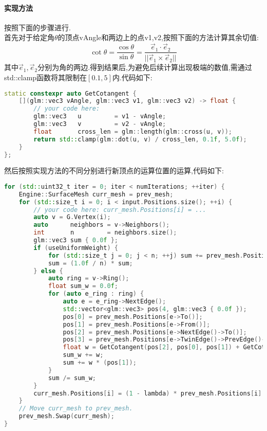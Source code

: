 \documentclass{ctexart}
\begin{document}
\paragraph{实现方法}
按照下面的步骤进行.\\
\indent 首先对于给定角$\theta$的顶点{\codefont vAngle}和两边上的点{\codefont v1,v2},按照下面的方法计算其余切值:
\[\cot\theta=\dfrac{\cos\theta}{\sin\theta}=\dfrac{\vec{e}_1\cdot\vec{e}_2}{||\vec{e}_1\times\vec{e}_2||}\]
其中$\vec{e}_1,\vec{e}_2$分别为角的两边.得到结果后,为避免后续计算出现极端的数值,需通过{\codefont std::clamp}函数将其限制在$[0.1,5]$内.代码如下:
\begin{lstlisting}[language=C++]
static constexpr auto GetCotangent {
    [](glm::vec3 vAngle, glm::vec3 v1, glm::vec3 v2) -> float {
        // your code here:
        glm::vec3   u         = v1 - vAngle;
        glm::vec3   v         = v2 - vAngle;
        float       cross_len = glm::length(glm::cross(u, v));
        return std::clamp(glm::dot(u, v) / cross_len, 0.1f, 5.0f);
    }
};
\end{lstlisting}
然后按照实现方法的不同分别进行新顶点的运算位置的运算,代码如下:
\begin{lstlisting}[language=C++]
for (std::uint32_t iter = 0; iter < numIterations; ++iter) {
    Engine::SurfaceMesh curr_mesh = prev_mesh;
    for (std::size_t i = 0; i < input.Positions.size(); ++i) {
        // your code here: curr_mesh.Positions[i] = ...
        auto v = G.Vertex(i);
        auto      neighbors = v->Neighbors();
        int       n         = neighbors.size();
        glm::vec3 sum { 0.0f };
        if (useUniformWeight) {
            for (std::size_t j = 0; j < n; ++j) sum += prev_mesh.Positions[neighbors[j]];
            sum = (1.0f / n) * sum;
        } else {
            auto ring = v->Ring();
            float sum_w = 0.0f;
            for (auto e_ring : ring) {
                auto e = e_ring->NextEdge();
                std::vector<glm::vec3> pos(4, glm::vec3 { 0.0f });
                pos[0] = prev_mesh.Positions[e->To()];
                pos[1] = prev_mesh.Positions[e->From()];
                pos[2] = prev_mesh.Positions[e->NextEdge()->To()];
                pos[3] = prev_mesh.Positions[e->TwinEdge()->PrevEdge()->From()];
                float w = GetCotangent(pos[2], pos[0], pos[1]) + GetCotangent(pos[3], pos[0], pos[1]);
                sum_w += w;
                sum += w * (pos[1]);
            }
            sum /= sum_w;
        }
        curr_mesh.Positions[i] = (1 - lambda) * prev_mesh.Positions[i] + lambda * sum;
    }
    // Move curr_mesh to prev_mesh.
    prev_mesh.Swap(curr_mesh);
}
\end{lstlisting}
\end{document}
